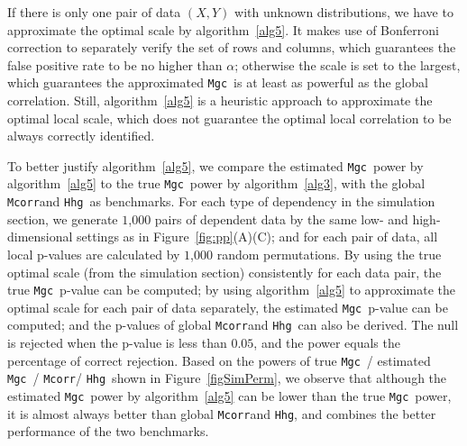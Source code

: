 \documentclass[11pt]{article}
\providecommand{\sct}[1]{{\sc \texttt{#1}}}
\newcommand{\Mgc}{\sct{Mgc}}
\newcommand{\Hhg}{\sct{Hhg}}
\newcommand{\Mcorr}{\sct{Mcorr}}
\begin{document}
If there is only one pair of data $(X,Y)$ with unknown distributions, we have to approximate the optimal scale by algorithm~\ref{alg5}. It makes use of Bonferroni correction to separately verify the set of rows and columns, which guarantees the false positive rate to be no higher than $\alpha$; otherwise the scale is set to the largest, which guarantees the approximated \Mgc~is at least as powerful as the global correlation. Still, algorithm~\ref{alg5} is a heuristic approach to approximate the optimal local scale, which does not guarantee the optimal local correlation to be always correctly identified.


To better justify algorithm~\ref{alg5}, we compare the estimated \Mgc~power by algorithm~\ref{alg5} to the true \Mgc~power by algorithm~\ref{alg3}, with the global \Mcorr and \Hhg~as benchmarks. For each type of dependency in the simulation section, we generate $1$,$000$ pairs of dependent data by the same low- and high-dimensional settings as in Figure~\ref{fig:pp}(A)(C); and for each pair of data, all local p-values are calculated by $1$,$000$ random permutations. By using the true optimal scale (from the simulation section) consistently for each data pair, the true \Mgc~p-value can be computed; by using algorithm~\ref{alg5} to approximate the optimal scale for each pair of data separately, the estimated \Mgc~p-value can be computed; and the p-values of global \Mcorr and \Hhg~can also be derived. The null is rejected when the p-value is less than $0.05$, and the power equals the percentage of correct rejection. Based on the powers of true \Mgc~/ estimated \Mgc~/ \Mcorr / \Hhg~shown in Figure~\ref{figSimPerm}, we observe that although the estimated \Mgc~power by algorithm~\ref{alg5} can be lower than the true \Mgc~power, it is almost always better than global \Mcorr and \Hhg, and combines the better performance of the two benchmarks. 
\end{document}
